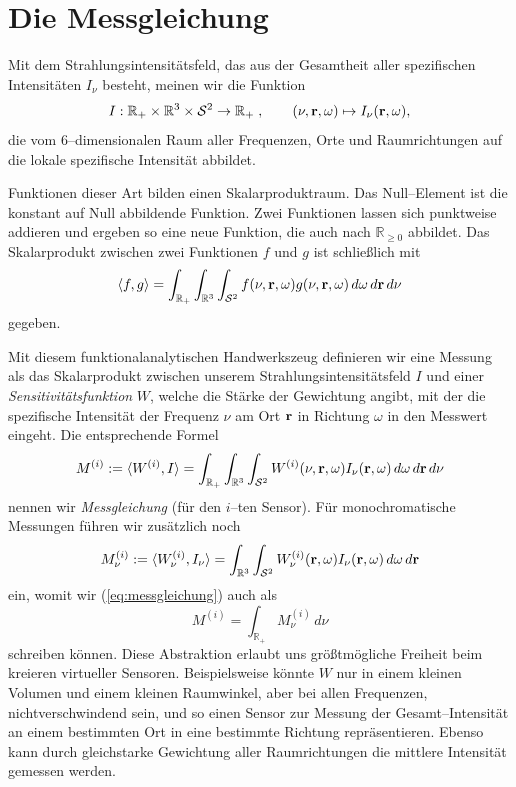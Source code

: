 	
	\section{Die Messgleichung}\label{sec:measurement_equation}
	Mit dem Strahlungsintensitätsfeld, das aus der Gesamtheit aller spezifischen Intensitäten $I_\nu$ besteht, meinen wir die Funktion
	$$I:\mathbb{R}_+\times\mathbb{R}^3\times\mathcal{S}^2\to\mathbb{R}_+\;,\qquad (\nu,\mathbf{r},\omega)\mapsto I_\nu(\mathbf{r},\omega),$$
	die vom 6--dimensionalen Raum aller Frequenzen, Orte und Raumrichtungen auf die lokale spezifische Intensität abbildet.
	
	Funktionen dieser Art bilden einen Skalarproduktraum. Das Null--Element ist die konstant auf Null abbildende Funktion. Zwei Funktionen lassen sich punktweise addieren und ergeben so eine neue Funktion, die auch nach $\mathbb{R}_{\geq 0}$ abbildet. Das Skalarprodukt zwischen zwei Funktionen $f$ und $g$ ist schließlich mit
	$$\langle f,g\rangle=\int_{\mathbb{R}_+} \int_{\mathbb{R}^3} \int_{\mathcal{S}^2} f(\nu,\mathbf{r},\omega)g(\nu,\mathbf{r},\omega)\,d\omega\,d\mathbf{r}\,d\nu$$
	gegeben.
	
	Mit diesem funktionalanalytischen Handwerkszeug definieren wir eine Messung als das Skalarprodukt zwischen unserem Strahlungsintensitätsfeld $I$ und einer {\em Sensitivitätsfunktion} $W$, welche die Stärke der Gewichtung angibt, mit der die spezifische Intensität der Frequenz $\nu$ am Ort $\mathbf{r}$ in Richtung $\omega$ in den Messwert eingeht. Die entsprechende Formel
	\begin{equation}\label{eq:messgleichung}
		M^{(i)}:=\langle W^{(i)},I\rangle=\int_{\mathbb{R}_+} \int_{\mathbb{R}^3} \int_{\mathcal{S}^2} W^{(i)}(\nu,\mathbf{r},\omega)I_\nu(\mathbf{r},\omega)\,d\omega\,d\mathbf{r}\,d\nu
	\end{equation}
	nennen wir {\em Messgleichung} (für den $i$--ten Sensor). Für monochromatische Messungen führen wir zusätzlich noch 
	\begin{equation}\label{eq:messgleichung_mono}
		M_\nu^{(i)}:=\langle W_\nu^{(i)},I_\nu\rangle=\int_{\mathbb{R}^3} \int_{\mathcal{S}^2} W_\nu^{(i)}(\mathbf{r},\omega)I_\nu(\mathbf{r},\omega)\,d\omega\,d\mathbf{r}
	\end{equation}
	ein, womit wir (\ref{eq:messgleichung}) auch als
	\begin{equation}\label{eq:messgleichung_frommonos}
		M^{(i)}=\int_{\mathbb{R}_+} M_\nu^{(i)}\,d\nu
	\end{equation}
	schreiben können.
	Diese Abstraktion erlaubt uns größtmögliche Freiheit beim kreieren virtueller Sensoren. Beispielsweise könnte $W$ nur in einem kleinen Volumen und einem kleinen Raumwinkel, aber bei allen Frequenzen, nichtverschwindend sein, und so einen Sensor zur Messung der Gesamt--Intensität an einem bestimmten Ort in eine bestimmte Richtung repräsentieren. Ebenso kann durch gleichstarke Gewichtung aller Raumrichtungen die mittlere Intensität gemessen werden.
	
